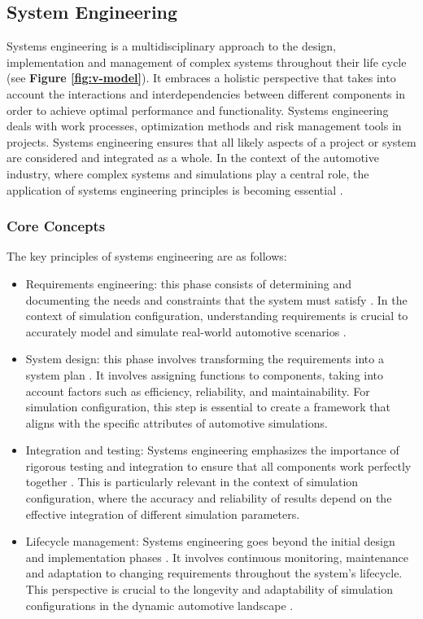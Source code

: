 \subsection{System Engineering \label{sec:sysen}}
Systems engineering is a multidisciplinary approach to the design, implementation and management of complex systems throughout their life cycle \cite{haberfellner2019systems} (see \textbf{Figure \ref{fig:v-model}}). It embraces a holistic perspective that takes into account the interactions and interdependencies between different components in order to achieve optimal performance and functionality. Systems engineering deals with work processes, optimization methods and risk management tools in projects. Systems engineering ensures that all likely aspects of a project or system are considered and integrated as a whole. In the context of the automotive industry, where complex systems and simulations play a central role, the application of systems engineering principles is becoming essential \cite{d2017systems}.

\subsubsection{Core Concepts}
    The key principles of systems engineering are as follows:
    \begin{itemize}
      \item Requirements engineering: this phase consists of determining and documenting the needs and constraints that the system must satisfy \cite{loper2015modeling}. In the context of simulation configuration, understanding requirements is crucial to accurately model and simulate real-world automotive scenarios \cite{keating2008system}.
      
      \item System design: this phase involves transforming the requirements into a system plan \cite{loper2015modeling, nielsen2015systems}. It involves assigning functions to components, taking into account factors such as efficiency, reliability, and maintainability. For simulation configuration, this step is essential to create a framework that aligns with the specific attributes of automotive simulations.
      
      \item Integration and testing: Systems engineering emphasizes the importance of rigorous testing and integration to ensure that all components work perfectly together \cite{loper2015modeling}. This is particularly relevant in the context of simulation configuration, where the accuracy and reliability of results depend on the effective integration of different simulation parameters.
      
      \item Lifecycle management: Systems engineering goes beyond the initial design and implementation phases \cite{loper2015modeling}. It involves continuous monitoring, maintenance and adaptation to changing requirements throughout the system's lifecycle. This perspective is crucial to the longevity and adaptability of simulation configurations in the dynamic automotive landscape \cite{nielsen2015systems}.
    \end{itemize}

